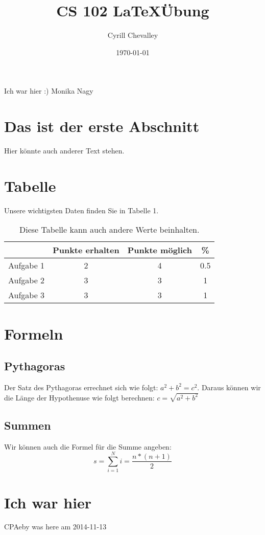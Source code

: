 \documentclass[11pt,a4paper]{article}
\title{CS 102 \LaTeX Übung}
\author{Cyrill Chevalley}
\date{\today}
\begin{document}
\maketitle

Ich war hier :) Monika Nagy

\section{Das ist der erste Abschnitt}
Hier könnte auch anderer Text stehen.

\section{Tabelle}
Unsere wichtigsten Daten finden Sie in Tabelle 1.
	\begin{table}[h]
	\begin{centering}
	\begin{tabular}{c|c|c|c}
	&Punkte erhalten&Punkte möglich& \% \\
	\hline
	Aufgabe 1&2&4&0.5 \\
	Aufgabe 2&3&3&1 \\
	Aufgabe 3&3&3&1 \\
	\end{tabular}
	\caption{Diese Tabelle kann auch andere Werte beinhalten.}
	\end{centering}
	\end{table}
	
\section{Formeln}
\subsection{Pythagoras}
Der Satz des Pythagoras errechnet sich wie folgt: $a^{2} + b^2 = c^2$.
Daraus können wir die Länge der Hypothenuse wie folgt berechnen: 
$c = \sqrt{a^2 + b^2} $

\subsection{Summen}	
Wir können auch die Formel für die Summe angeben:
\begin{equation}
s=\sum \limits_{i=1}^{N} i = \frac{n \ast (n+1)}{2}
\end{equation}


\section{Ich war hier}
CPAeby was here am 2014-11-13
\end{document}
